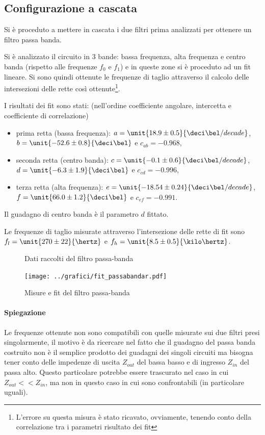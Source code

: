 \documentclass[10pt,a4paper]{article}
\begin{document}
\subsection{Configurazione a cascata}
Si è proceduto a mettere in cascata i due filtri prima analizzati per ottenere un filtro passa banda.

Si è analizzato il circuito in 3 bande: bassa frequenza, alta frequenza e centro banda (rispetto alle frequenze $f_0$ e $f_1$) e in queste zone si è proceduto ad un fit lineare. Si sono quindi ottenute le frequenze di taglio attraverso il calcolo delle intersezioni delle rette così ottenute\footnote{L'errore su questa misura è stato ricavato, ovviamente, tenendo conto della correlazione tra i parametri risultato dei fit}.

I risultati dei fit sono stati: (nell'ordine coefficiente angolare, intercetta e coefficiente di correlazione)
\begin{itemize}
	\item prima retta (bassa frequenza): $a=\unit{18.9 \pm 0.5}{\deci\bel/decade}$,  $b=\unit{-52.6 \pm 0.8}{\deci\bel}$ e $c_{ab} =  -0.968$, 
	\item seconda retta (centro banda):	$c=\unit{-0.1 \pm 0.6}{\deci\bel/decade}$, $d=\unit{-6.3 \pm 1.9}{\deci\bel}$ e $c_{cd} = -0.996$,
	\item terza retta (alta frequenza):	$e=\unit{-18.54 \pm 0.24}{\deci\bel/decade}$, $f=\unit{66.0 \pm 1.2}{\deci\bel}$ e $c_{ef} =-0.991$.
\end{itemize}
Il guadagno di centro banda è il parametro $d$ fittato.

Le frequenze di taglio misurate attraverso l'intersezione delle rette di fit sono $f_l = \unit{270 \pm 22}{\hertz}$ e $f_h = \unit{8.5 \pm 0.5}{\kilo\hertz}$.
\begin{figure}[h!]
	\centering
	\resizebox{0.6\textwidth}{!}{
	}
	\caption{Dati raccolti del filtro passa-banda}
\end{figure}
\begin{figure}[h!]
	\centering
	\texttt{[image: ../grafici/fit\_passabandar.pdf]}
	\caption{Misure e fit del filtro passa-banda}
\end{figure}

\paragraph{Spiegazione}
Le frequenze ottenute non sono compatibili con quelle misurate sui due filtri presi singolarmente, il motivo è da ricercare nel fatto che il guadagno del passa banda costruito non è il semplice prodotto dei guadagni dei singoli circuiti ma bisogna tener conto delle impedenze di uscita $Z_{out}$ del bassa basso e di ingresso $Z_{in}$ del passa alto. Questo particolare potrebbe essere trascurato nel caso in cui $Z_{out} << Z_{in}$, ma non in questo caso in cui sono confrontabili (in particolare uguali).
\end{document}
